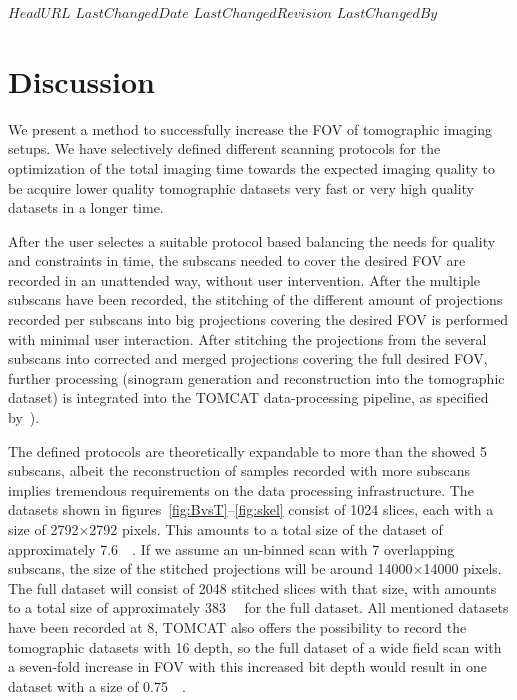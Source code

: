 \svnidlong
{$HeadURL$}
{$LastChangedDate$}
{$LastChangedRevision$}
{$LastChangedBy$}

\ifhtml
\else
\begin{center}
\end{center}
\fi

\section{Discussion}
\cbstart
We present a method to successfully increase the FOV of tomographic imaging setups. We have selectively defined different scanning protocols for the optimization of the total imaging time towards the expected imaging quality to be acquire lower quality tomographic datasets very fast or very high quality datasets in a longer time.

After the user selectes a suitable protocol based balancing the needs for quality and constraints in time, the subscans needed to cover the desired FOV are recorded in an unattended way, without user intervention. After the multiple subscans have been recorded, the stitching of the different amount of projections recorded per subscans into big projections covering the desired FOV is performed with minimal user interaction. %
After stitching the projections from the several subscans into corrected and merged projections covering the full desired FOV, further processing (sinogram generation and reconstruction into the tomographic dataset) is integrated into the TOMCAT data-processing pipeline, as specified by~\citet{Hintermueller2009}).

The defined protocols are theoretically expandable to more than the showed 5 subscans, albeit the reconstruction of samples recorded with more subscans implies tremendous requirements on the data processing infrastructure. The datasets shown in figures~\ref{fig:BvsT}--\ref{fig:skel} consist of 1024 slices, each with a size of 2792\(\times\)2792 pixels. This amounts to a total size of the dataset of approximately \SI{7.6}{\giga\byte}. If we assume an un-binned scan with 7 overlapping subscans, the size of the stitched projections will be around 14000\(\times\)14000 pixels. The full dataset will consist of 2048 stitched slices with that size, with amounts to a total size of approximately \SI{383}{\giga\byte} for the full dataset. All mentioned datasets have been recorded at \SI{8}{\bit}, TOMCAT also offers the possibility to record the tomographic datasets with \SI{16}{\bit} depth, so the full dataset of a wide field scan with a seven-fold increase in FOV with this increased bit depth would result in one dataset with a size of \SI{0.75}{\tera\byte}.

